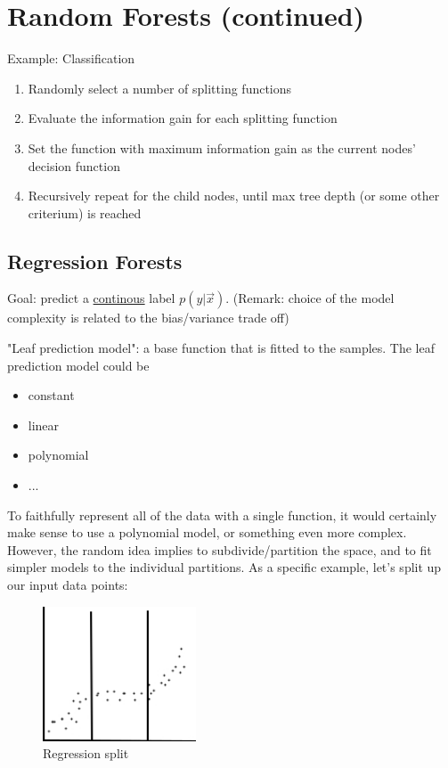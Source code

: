 \documentclass{scrartcl}
\begin{document}
\section{Random Forests (continued)}
Example: Classification
\begin{enumerate}
    \item
        Randomly select a number of splitting functions 
    \item
        Evaluate the information gain for each splitting function
    \item
        Set the function with maximum information gain as the current nodes' decision function
    \item
        Recursively repeat for the child nodes, until max tree depth (or some other criterium) is reached 
\end{enumerate}

\subsection{Regression Forests}
Goal: predict a \underline{continous} label \(p(y|\vec{x})\). (Remark: choice of the model complexity is related to the bias/variance trade off)

"Leaf prediction model": a base function that is fitted to the samples. The leaf prediction model could be
\begin{multicols}{2}
\begin{itemize}
    \item
        constant
    \item
        linear
    \item
        polynomial
    \item
        ...
\end{itemize}
\end{multicols}

To faithfully represent all of the data with a single function, it would certainly make sense to use a polynomial model, or something even more complex. However, the random idea implies to subdivide/partition the space, and to fit simpler models to the individual partitions. As a specific example, let's split up our input data points:

\begin{figure}[ht]
	\centering
    \includegraphics[height=4cm]{img/rf_regression.jpg}
	\caption{Regression split}
	\label{fig:rf_regression}
\end{figure}
\end{document}
